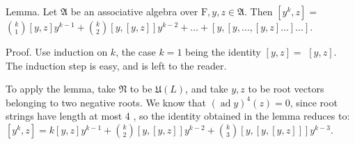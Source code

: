 \documentclass[10pt]{article}
\begin{document}
Lemma. Let $\mathfrak{A}$ be an associative algebra over $\mathrm{F}, y, z \in \mathfrak{A}$. Then $\left[y^{k}, z\right]=$ $\binom{k}{1}[y, z] y^{k-1}+\binom{k}{2}[y,[y, z]] y^{k-2}+\ldots+[y,[y, \ldots,[y, z] \ldots] \ldots]$.

Proof. Use induction on $k$, the case $k=1$ being the identity $[y, z]=$ $[y, z]$. The induction step is easy, and is left to the reader.

To apply the lemma, take $\mathfrak{N}$ to be $\mathfrak{U}(L)$, and take $y, z$ to be root vectors belonging to two negative roots. We know that $(\operatorname{ad} y)^{4}(z)=0$, since root strings have length at most 4 , so the identity obtained in the lemma reduces to: $\left[y^{k}, z\right]=k[y, z] y^{k-1}+\binom{k}{2}[y,[y, z]] y^{k-2}+\binom{k}{3}[y,[y,[y, z]]] y^{k-3}$.
\end{document}
